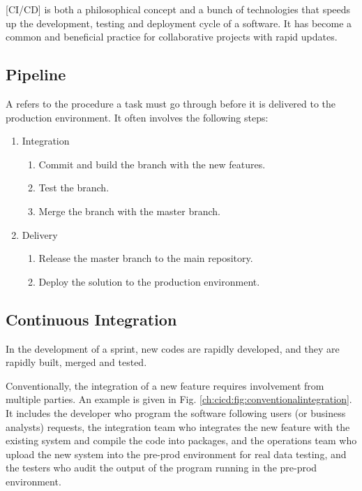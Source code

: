 [CI/CD] is both a philosophical concept and a bunch of technologies that speeds up the development, testing and deployment cycle of a software. It has become a common and beneficial practice for collaborative projects with rapid updates.

\subsection{Pipeline}

A  refers to the procedure a task must go through before it is delivered to the production environment. It often involves the following steps:
\begin{enumerate}
  \item Integration
  \begin{enumerate}
    \item Commit and build the branch with the new features.
    \item Test the branch.
    \item Merge the branch with the master branch.
  \end{enumerate}
  \item Delivery
  \begin{enumerate}
    \item Release the master branch to the main repository.
    \item Deploy the solution to the production environment.
  \end{enumerate}
\end{enumerate}

\subsection{Continuous Integration}

In the development of a sprint, new codes are rapidly developed, and they are rapidly built, merged and tested.

Conventionally, the integration of a new feature requires involvement from multiple parties. An example is given in Fig. \ref{ch:cicd:fig:conventionalintegration}. It includes the developer who program the software following users (or business analysts) requests, the integration team who integrates the new feature with the existing system and compile the code into packages, and the operations team who upload the new system into the pre-prod environment for real data testing, and the testers who audit the output of the program running in the pre-prod environment.

